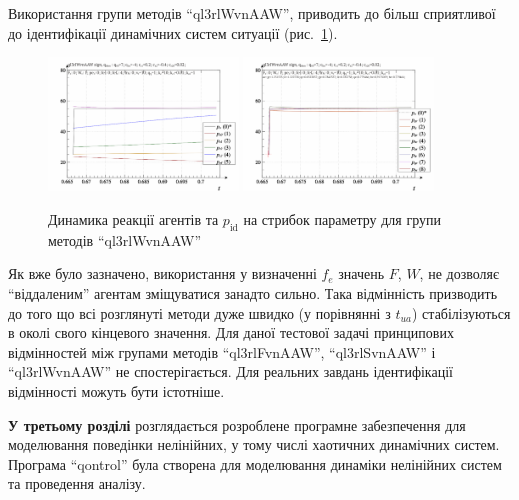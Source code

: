 \documentclass[a4paper,13pt]{atuaref}
\begin{document}
Використання  групи методів ``ql3rlWvnAAW'',
приводить до більш сприятливої до ідентифікації динамічних систем ситуації
(рис.~\ref{atu:f:ql3rlWvnAAW_sign}).

\begin{figure}[htb!]
  \centerline{
    \includegraphics[width=0.45\textwidth]{p3/p/sign/qls-p_t_pi_m_ql3rlWvnAAW_sign.png}
    \hfill
    \includegraphics[width=0.45\textwidth]{p3/p/sign/qls-p_t_p_m_ql3rlWvnAAW_sign.png}
  }
  \caption{Динамика реакції агентів та $p_\mathrm{id}$ на стрибок параметру для групи методів ``ql3rlWvnAAW''}
  \label{atu:f:ql3rlWvnAAW_sign}
\end{figure}

Як вже було зазначено, використання у визначенні $ f_e $ значень $F$, $W$,
не дозволяє ``віддаленим'' агентам зміщуватися занадто сильно. Така відмінність
призводить до того що всі розглянуті методи дуже швидко (у порівнянні з $ t_{ua} $)
стабілізуються в околі свого кінцевого значення.
%
Для даної тестової задачі принципових відмінностей між групами методів
``ql3rlFvnAAW'', ``ql3rlSvnAAW'' і ``ql3rlWvnAAW'' не спостерігається. Для
реальних завдань ідентифікації відмінності можуть бути істотніше.



\medskip
\textbf{У третьому розділі}
розглядається розроблене програмне
забезпечення
для моделювання
поведінки  нелінійних,
у тому числі хаотичних динамічних систем.
Програма ``qontrol'' була створена для моделювання динаміки
нелінійних систем та проведення аналізу.
\end{document}
